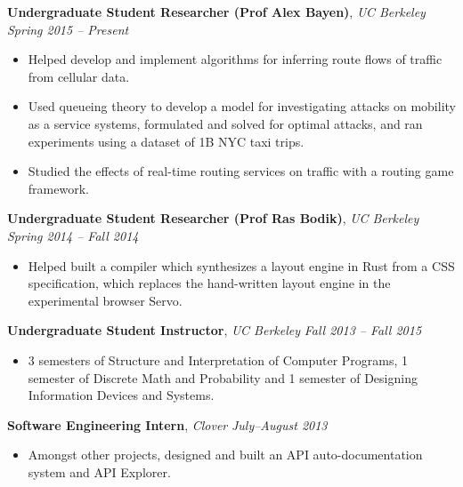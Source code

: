 \documentclass[9pt]{article}
\newenvironment{changemargin}[2]{%
  \begin{list}{}{%
      \setlength{\topsep}{0pt}%
      \setlength{\leftmargin}{#1}%
      \setlength{\rightmargin}{#2}%
      \setlength{\listparindent}{\parindent}%
      \setlength{\itemindent}{\parindent}%
      \setlength{\parsep}{\parskip}%
    }%
  \item[]}{\end{list}
}
\newenvironment{body} {
  \vspace*{-16pt}
  \begin{changemargin}{-0.25in}{-0.5in}
  }
  {\end{changemargin}
}
\begin{document}
\begin{body}
  \vspace{14pt}

  \textbf{Undergraduate Student Researcher (Prof Alex Bayen)}, \emph{UC Berkeley} \hfill \emph{Spring 2015 -- Present}\\
  \vspace*{-5pt}
  \begin{itemize} \itemsep -0pt  %
  \item Helped develop and implement algorithms for inferring route flows of
    traffic from cellular data.
  \item Used queueing theory to develop a model for investigating attacks on
    mobility as a service systems, formulated and solved for optimal attacks,
    and ran experiments using a dataset of 1B NYC taxi trips.
  \item Studied the effects of real-time routing services on traffic with a
    routing game framework.
  \end{itemize}

  \textbf{Undergraduate Student Researcher (Prof Ras Bodik)}, \emph{UC Berkeley} \hfill \emph{Spring 2014 -- Fall 2014}\\
  \vspace*{-5pt}
  \begin{itemize} \itemsep -0pt  %
  \item Helped built a compiler which synthesizes a layout engine in Rust from a
    CSS specification, which replaces the hand-written layout engine in the
    experimental browser Servo.
  \end{itemize}

  \textbf{Undergraduate Student Instructor}, \emph{UC Berkeley} \hfill \emph{Fall 2013 -- Fall 2015}\\
  \vspace*{-5pt}
  \begin{itemize} \itemsep -0pt  %
  \item 3 semesters of Structure and Interpretation of Computer Programs, 1
    semester of Discrete Math and Probability and 1 semester of Designing
    Information Devices and Systems.
  \end{itemize}

  \textbf{Software Engineering Intern}, \emph{Clover} \hfill \emph{July--August 2013}\\
  \vspace*{-5pt}
  \begin{itemize} \itemsep -0pt  %
  \item Amongst other projects, designed and built an API auto-documentation system and API Explorer.
  \end{itemize}
\end{body}
\end{document}
